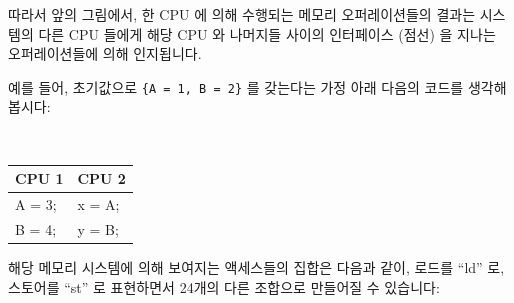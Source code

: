 따라서 앞의 그림에서, 한 CPU 에 의해 수행되는 메모리 오퍼레이션들의 결과는
시스템의 다른 CPU 들에게 해당 CPU 와 나머지들 사이의 인터페이스 (점선) 을
지나는 오퍼레이션들에 의해 인지됩니다.


예를 들어, 초기값으로 {\tt \{A = 1, B = 2\}} 를 갖는다는 가정 아래 다음의
코드를 생각해 봅시다:

\vspace{5pt}
\begin{minipage}[t]{\columnwidth}
\tt
\scriptsize
\begin{tabular}{l|l}
	CPU 1 &		CPU 2 \\
	\hline
	A = 3; &	x = A; \\
	B = 4; &	y = B; \\
\end{tabular}
\end{minipage}
\vspace{5pt}

해당 메모리 시스템에 의해 보여지는 액세스들의 집합은 다음과 같이, 로드를 ``ld''
로, 스토어를 ``st'' 로 표현하면서 24개의 다른 조합으로 만들어질 수 있습니다:

